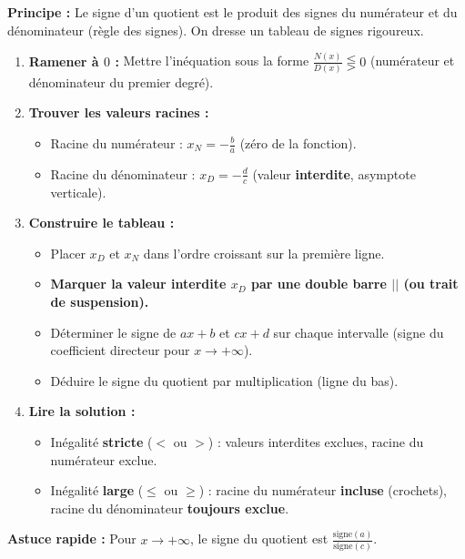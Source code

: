 \documentclass[11pt]{article}
\begin{document}
\begin{methode}
    \textbf{Principe :} Le signe d'un quotient est le produit des signes du numérateur et du dénominateur (règle des signes). On dresse un tableau de signes rigoureux.
    \begin{enumerate}
        \item \textbf{Ramener à $0$ :} Mettre l'inéquation sous la forme $\frac{N(x)}{D(x)} \lesseqgtr 0$ (numérateur et dénominateur du premier degré).
        \item \textbf{Trouver les valeurs racines :}
        \begin{itemize}
            \item Racine du numérateur : $x_N = -\frac{b}{a}$ (zéro de la fonction).
            \item Racine du dénominateur : $x_D = -\frac{d}{c}$ (valeur \textbf{interdite}, asymptote verticale).
        \end{itemize}
        \item \textbf{Construire le tableau :}
        \begin{itemize}
            \item Placer $x_D$ et $x_N$ dans l'ordre croissant sur la première ligne.
            \item \textbf{Marquer la valeur interdite $x_D$ par une double barre $||$ (ou trait de suspension).}
            \item Déterminer le signe de $ax+b$ et $cx+d$ sur chaque intervalle (signe du coefficient directeur pour $x \to +\infty$).
            \item Déduire le signe du quotient par multiplication (ligne du bas).
        \end{itemize}
        \item \textbf{Lire la solution :}
        \begin{itemize}
            \item Inégalité \textbf{stricte} ($<$ ou $>$) : valeurs interdites exclues, racine du numérateur exclue.
            \item Inégalité \textbf{large} ($\le$ ou $\ge$) : racine du numérateur \textbf{incluse} (crochets), racine du dénominateur \textbf{toujours exclue}.
        \end{itemize}
    \end{enumerate}
    \textbf{Astuce rapide :} Pour $x \to +\infty$, le signe du quotient est $\frac{\text{signe}(a)}{\text{signe}(c)}$.
\end{methode}
\end{document}
